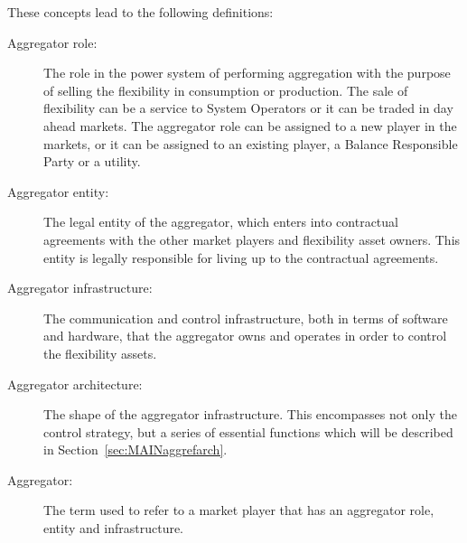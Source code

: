 These concepts lead to the following definitions:
\begin{description}
	\item[Aggregator role:] The role in the power system of performing aggregation with the purpose of selling the flexibility in consumption or production. The sale of flexibility can be a service to System Operators or it can be traded in day ahead markets. The aggregator role can be assigned to a new player in the markets, or it can be assigned to an existing player, \eg a Balance Responsible Party or a utility.
	\item[Aggregator entity:] The legal entity of the aggregator, which enters into contractual agreements with the other market players and flexibility asset owners. This entity is legally responsible for living up to the contractual agreements.
	\item[Aggregator infrastructure:] The communication and control infrastructure, both in terms of software and hardware, that the aggregator owns and operates in order to control the flexibility assets. 
	\item[Aggregator architecture:] The shape of the aggregator infrastructure. This encompasses not only the control strategy, but a series of essential functions which will be described in Section~\ref{sec:MAINaggrefarch}.
	\item[Aggregator:] The term used to refer to a market player that has an aggregator role, entity and infrastructure.
\end{description}

